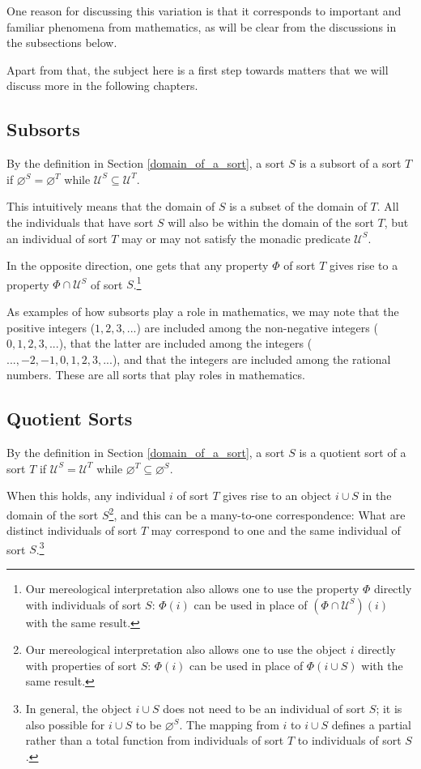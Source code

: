 \documentclass[12pt]{book}
\begin{document}
One reason for discussing this variation is that it corresponds to important and familiar phenomena from mathematics, as will be clear from the discussions in the subsections below.

Apart from that, the subject here is a first step towards matters that we will discuss more in the following chapters.

\subsection{Subsorts} \label{subsorts}
By the definition in Section \ref{domain_of_a_sort}, a sort $S$ is a subsort of a sort $T$ if $\varnothing^S = \varnothing^T$ while $\mathcal{U}^S \subseteq \mathcal{U}^T$.

This intuitively means that the domain of $S$ is a subset of the domain of $T$. All the individuals that have sort $S$ will also be within the domain of the sort $T$, but an individual of sort $T$ may or may not satisfy the monadic predicate $\mathcal{U}^S$.

In the opposite direction, one gets that any property $\Phi$ of sort $T$ gives rise to a property $\Phi \cap \mathcal{U}^S$ of sort $S$.\footnote{Our mereological interpretation also allows one to use the property $\Phi$ directly with individuals of sort $S$: $\Phi(i)$ can be used in place of $(\Phi \cap \mathcal{U}^S)(i)$ with the same result.}

As examples of how subsorts play a role in mathematics, we may note that the positive integers ($1, 2, 3, ...$) are included among the non-negative integers ($0, 1, 2, 3, ...$), that the latter are included among the integers ($..., -2, -1, 0, 1, 2, 3, ...$), and that the integers are included among the rational numbers. These are all sorts that play roles in mathematics.

\subsection{Quotient Sorts} \label{quotient_sorts}
By the definition in Section \ref{domain_of_a_sort}, a sort $S$ is a quotient sort of a sort $T$ if $\mathcal{U}^S = \mathcal{U}^T$ while $\varnothing^T \subseteq \varnothing^S$.

When this holds, any individual $i$ of sort $T$ gives rise to an object $i \cup S$ in the domain of the sort $S$\footnote{Our mereological interpretation also allows one to use the object $i$ directly with properties of sort $S$: $\Phi(i)$ can be used in place of $\Phi(i \cup S)$ with the same result.}, and this can be a many-to-one correspondence: What are distinct individuals of sort $T$ may correspond to one and the same individual of sort $S$.\footnote{In general, the object $i \cup S$ does not need to be an individual of sort $S$; it is also possible for $i \cup S$ to be $\varnothing^S$. The mapping from $i$ to $i \cup S$ defines a partial rather than a total function from individuals of sort $T$ to individuals of sort $S$.}
\end{document}
